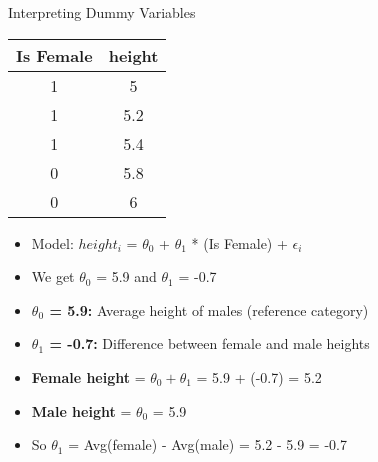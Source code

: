 \documentclass{beamer}
\begin{document}
    \begin{frame}{Interpreting Dummy Variables}
    \begin{center}
        \pause \begin{tabular}{c|c}
            Is Female& height\\
            \hline
            \hline
            1 & 5 \\
            1 & 5.2 \\
            1 & 5.4 \\
            0 & 5.8 \\
            0 & 6 \\
        \end{tabular}
    \end{center}
    \begin{itemize}[<+->]
        \item Model: $height_{i}$ = $\theta_{0}$ + $\theta_{1}$ *  (Is Female) + $\epsilon_{i}$
        \item We get $\theta_0$ = 5.9 and $\theta_1$ = -0.7
        \item \textbf{$\theta_{0}$ = 5.9:} Average height of males (reference category)
        \item \textbf{$\theta_{1}$ = -0.7:} Difference between female and male heights
        \item \textbf{Female height} = $\theta_{0} + \theta_{1}$ = 5.9 + (-0.7) = 5.2
        \item \textbf{Male height} = $\theta_{0}$ = 5.9
        \item So $\theta_{1}$ = Avg(female) - Avg(male) = 5.2 - 5.9 = -0.7
    \end{itemize}
    \end{frame}
    
\end{document}
